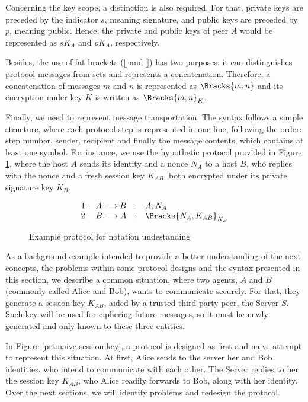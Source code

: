 Concerning the key scope, a distinction is also required. For that, private keys are preceded by the indicator $s$, meaning signature, and public keys are preceded by $p$, meaning public. Hence, the private and public keys of peer $A$ would be represented as $sK_A$ and $pK_A$, respectively.

Besides, the use of fat brackets ($\lBrack$ and $\rBrack$) has two purposes: it can distinguishes protocol messages from sets and represents a concatenation. Therefore, a concatenation of messages $m$ and $n$ is represented as $\Bracks{m,n}$ and its encryption under key $K$ is written as $\Bracks{m,n}_K$.

Finally, we need to represent message transportation. The syntax follows a simple structure, where each protocol step is represented in one line, following the order: step number, sender, recipient and finally the message contents, which contains at least one symbol. For instance, we use the hypothetic protocol provided in Figure \ref{prt:notation-example}, where the host $A$ sends its identity and a nonce $N_A$ to a host $B$, who replies with the nonce and a fresh session key $K_{AB}$, both encrypted under its private signature key $K_B$.

\begin{figure}[ht]
  \centering
    \[
    \begin{array}{rlcl}
      1. & A \longrightarrow B &:& A, N_A \\
      2. & B \longrightarrow A &:& \Bracks{N_A, K_{AB}}_{K_B} \\
    \end{array}
    \]
  \caption{Example protocol for notation undestanding}
  \label{prt:notation-example}
\end{figure}

As a background example intended to provide a better understanding of the next concepts, the problems within some protocol designs and the syntax presented in this section, we describe a common situation, where two agents, $A$ and $B$ (commonly called Alice and Bob), wants to communicate securely. For that, they generate a session key $K_{AB}$, aided by a trusted third-party peer, the Server $S$. Such key will be used for ciphering future messages, so it must be newly generated and only known to these three entities.

In Figure \ref{prt:naive-session-key}, a protocol is designed as first and naive attempt to represent this situation. At first, Alice sends to the server her and Bob identities, who intend to communicate with each other. The Server replies to her the session key $K_{AB}$, who Alice readily forwards to Bob, along with her identity. Over the next sections, we will identify problems and redesign the protocol.


